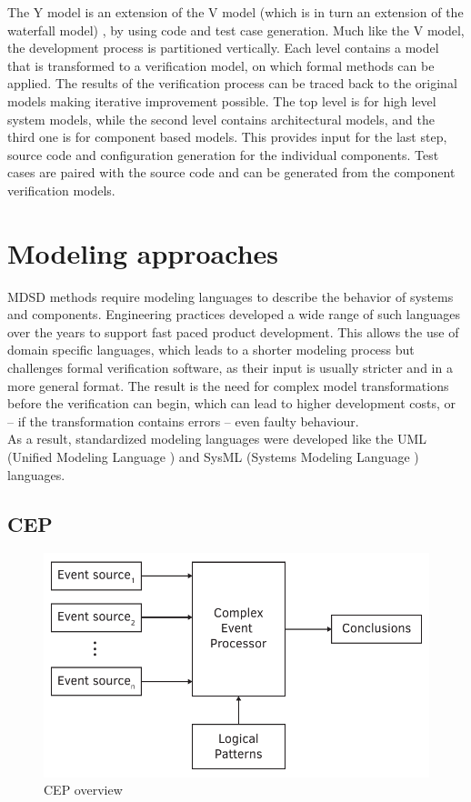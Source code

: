 The Y model \citep{ymodel} is an extension of the V model (which is in turn an extension of the waterfall model) \citep{randomwikipedialink3}, by using code and test case generation. Much like the V model, the development process is partitioned vertically. Each level contains a model that is transformed to a verification model, on which formal methods can be applied. The results of the verification process can be traced back to the original models making iterative improvement possible. The top level is for high level system models, while the second level contains architectural models, and the third one is for component based models. This provides input for the last step, source code and configuration generation for the individual components. Test cases are paired with the source code and can be generated from the component verification models.

\section*{Modeling approaches}

MDSD methods require modeling languages to describe the behavior of systems and components. Engineering practices developed a wide range of such languages over the years to support fast paced product development. This allows the use of domain specific languages, which leads to a shorter modeling process but challenges formal verification software, as their input is usually stricter and in a more general format. The result is the need for complex model transformations before the verification can begin, which can lead to higher development costs, or -- if the transformation contains errors -- even faulty behaviour.\\
As a result, standardized modeling languages were developed like the UML (Unified Modeling Language \citep{uml}) and SysML (Systems Modeling Language \citep{sysml}) languages.

\subsection*{CEP}

\begin{figure}[h]
	\centering
	\includegraphics[width=0.8\linewidth]{include/figures/chapter_1/CEP}
	\caption{CEP overview}
	\label{fig:intro:vmodel}
\end{figure}


